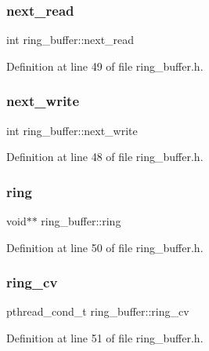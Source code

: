 \subsubsection{\texorpdfstring{next\+\_\+read}{next\_read}}
{\footnotesize\ttfamily int ring\+\_\+buffer\+::next\+\_\+read}



Definition at line 49 of file ring\+\_\+buffer.\+h.

\hypertarget{structring__buffer_af3f14937423dc6d693444d550b498c12}{}\label{structring__buffer_af3f14937423dc6d693444d550b498c12} 
\subsubsection{\texorpdfstring{next\+\_\+write}{next\_write}}
{\footnotesize\ttfamily int ring\+\_\+buffer\+::next\+\_\+write}



Definition at line 48 of file ring\+\_\+buffer.\+h.

\hypertarget{structring__buffer_a9c694810d59531a5725341dc33d02445}{}\label{structring__buffer_a9c694810d59531a5725341dc33d02445} 
\subsubsection{\texorpdfstring{ring}{ring}}
{\footnotesize\ttfamily void$\ast$$\ast$ ring\+\_\+buffer\+::ring}



Definition at line 50 of file ring\+\_\+buffer.\+h.

\hypertarget{structring__buffer_add8eae2fb8095b3a680d40f77e4ccf14}{}\label{structring__buffer_add8eae2fb8095b3a680d40f77e4ccf14} 
\subsubsection{\texorpdfstring{ring\+\_\+cv}{ring\_cv}}
{\footnotesize\ttfamily pthread\+\_\+cond\+\_\+t ring\+\_\+buffer\+::ring\+\_\+cv}



Definition at line 51 of file ring\+\_\+buffer.\+h.

